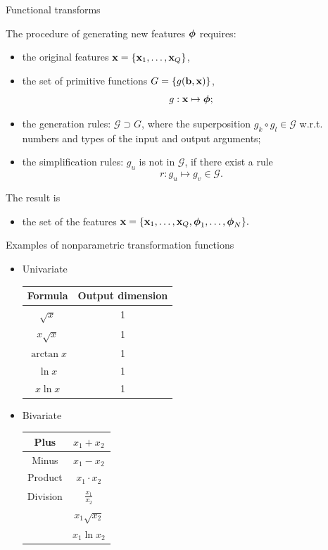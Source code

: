 \documentclass{beamer}
\begin{document}
\begin{frame}{Functional transforms}

The procedure of generating new features ${\boldsymbol{\phi}}$ requires:
\begin{itemize}
\item the original features ${\mathbf{x}} = \{{\mathbf{x}}_1, \dots, {\mathbf{x}}_Q\}$,
\item the set of primitive functions $G = \{g(\mathbf{b},{\mathbf{x}})\}$,
    $$g:{\mathbf{x}} \mapsto {\boldsymbol{\phi}};$$
\item the generation rules: $\mathcal{G}\supset G$, where the superposition $g_k\circ g_l \in \mathcal{G}$ w.r.t. numbers and types of the input and output arguments;
\item the simplification rules: $g_u$ is not in $\mathcal{G}$, if there exist a rule
$$
r:g_u \mapsto g_v \in \mathcal{G}.
$$
\end{itemize}


\bigskip
The result is
\begin{itemize}
\item[] the set of the features ${\mathbf{x}}=\{\mathbf{x}_1,\dots,\mathbf{x}_{Q},{\boldsymbol{\phi}}_{1},\dots,{\boldsymbol{\phi}}_N\}.$
\end{itemize}

\end{frame}
\begin{frame}{Examples of nonparametric transformation functions}

\begin{itemize}
\item Univariate \quad
\begin{tabular}{c|c}
Formula		&	Output dimension	\\ \hline
$	\sqrt{x}	$	&	1		\\ \hline
$	x\sqrt{x}	$	&	1		\\ \hline
$	\arctan{x}	$	&	1		\\ \hline
$	\ln{x}	$	&	1	\\ \hline
$	x\ln{x}	$	&	1	\\
\end{tabular}

\medskip
\item Bivariate \quad
\begin{tabular}{c|c}
Plus	&	$	x_1 + x_2	$	\\ \hline
Minus	&	$	x_1 - x_2	$	\\ \hline
Product	&	$	x_1 \cdot x_2	$	\\ \hline
Division	&	$	\frac{x_1}{x_2}	$	\\ \hline
	&	$	x_1\sqrt{x_2}	$	\\ \hline
	&	$	x_1\ln{x_2}	$	\\
\end{tabular}

\end{itemize}

\end{frame}
\end{document}
